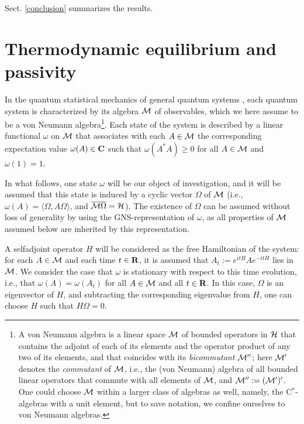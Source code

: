 \documentclass[a4paper,11pt]{article}
\def\dt{\cal}
\def\dM{{\dt M}}
\def\H{{\cal H}}
\def\gO{\Omega}
\def\go{\omega}
\def\complex{{\bf C}}
\def\reals{{\bf R}}
\begin{document}
Sect. \ref{conclusion} summarizes the results.

\section{Thermodynamic equilibrium and passivity}
\label{intro}

In the quantum statistical mechanics of general quantum systems
\cite{BR1,BR2}, each quantum system is characterized by its
algebra $\dM$ of observables, which we here assume to be a von Neumann
algebra\footnote{A von Neumann algebra is a linear space
$\dM$ of bounded operators in $\H$ that contains the adjoint of each
of its elements and the operator product of any two of its elements,
and that coincides with its {\it bicommutant} $\dM''$; here
$\dM'$ denotes the {\it
commutant} of $\dM$, i.e., the (von Neumann) algebra of all bounded
linear operators that commute with all elements of $\dM$, and
$\dM'':=(\dM')'$. One could choose $\dM$ within a larger class of
algebras as well, namely, the C$^*$-algebras with a unit element, but
to save notation, we confine ourselves to von Neumann algebras.}.
Each state of the system is described by a
linear functional $\go$ on $\dM$
that associates with each $A\in\dM$ the corresponding
expectation value $\go(A)\in\complex$ such that
$\go(A^*A)\geq0$ for all $A\in\dM$ and $\go(1)=1$.

In what follows, one state $\go$ will be our object of
investigation, and it will be assumed that this state
is induced by a cyclic vector $\gO$ of $\dM$
(i.e., $\go(A)=\langle\gO,A\gO\rangle$, and
$\overline{\dM\gO}=\H$). The existence of $\gO$
can be assumed without
loss of generality by using the GNS-representation
of $\go$, as all properties
of $\dM$ assumed below are inherited by this representation.

A selfadjoint operator $H$ will be considered as the free
Hamiltonian of the system: for each $A\in\dM$ and each
time $t\in\reals$,
it is assumed that $A_t:=e^{itH}Ae^{-itH}$ lies in $\dM$.
We consider the case that $\go$ is stationary with respect to this
time evolution, i.e., that $\go(A)=\go(A_t)$ for all $A\in\dM$
and all $t\in\reals$. In this case, $\gO$ is an eigenvector of $H$, and
subtracting the corresponding eigenvalue from $H$, one can choose
$H$ such that $H\gO=0$.
\end{document}
